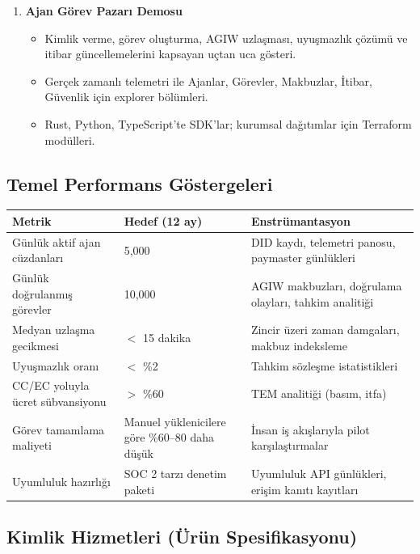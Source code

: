 \documentclass[11pt]{article}
\begin{document}
\begin{enumerate}[label=\textbf{D\arabic*.}, leftmargin=*]
\begin{itemize}[noitemsep]
  \end{itemize}
  \item \textbf{Ajan Görev Pazarı Demosu}
  \begin{itemize}[noitemsep]
    \item Kimlik verme, görev oluşturma, AGIW uzlaşması, uyuşmazlık çözümü ve itibar güncellemelerini kapsayan uçtan uca gösteri.
    \item Gerçek zamanlı telemetri ile Ajanlar, Görevler, Makbuzlar, İtibar, Güvenlik için explorer bölümleri.
    \item Rust, Python, TypeScript'te SDK'lar; kurumsal dağıtımlar için Terraform modülleri.
  \end{itemize}
\end{enumerate}

\subsection{Temel Performans Göstergeleri}
\begin{longtable}{@{}p{}p{}p{}@{}}
\toprule
\textbf{Metrik} & \textbf{Hedef (12 ay)} & \textbf{Enstrümantasyon} \\\midrule
Günlük aktif ajan cüzdanları & 5,000 & DID kaydı, telemetri panosu, paymaster günlükleri \\
Günlük doğrulanmış görevler & 10,000 & AGIW makbuzları, doğrulama olayları, tahkim analitiği \\
Medyan uzlaşma gecikmesi & $<$ 15 dakika & Zincir üzeri zaman damgaları, makbuz indeksleme \\
Uyuşmazlık oranı & $<$ \%2 & Tahkim sözleşme istatistikleri \\
CC/EC yoluyla ücret sübvansiyonu & $>$ \%60 & TEM analitiği (basım, itfa) \\
Görev tamamlama maliyeti & Manuel yüklenicilere göre \%60--80 daha düşük & İnsan iş akışlarıyla pilot karşılaştırmalar \\
Uyumluluk hazırlığı & SOC 2 tarzı denetim paketi & Uyumluluk API günlükleri, erişim kanıtı kayıtları \\
\bottomrule
\end{longtable}

\subsection{Kimlik Hizmetleri (Ürün Spesifikasyonu)}
\label{sec:identity-spec}
\end{document}
